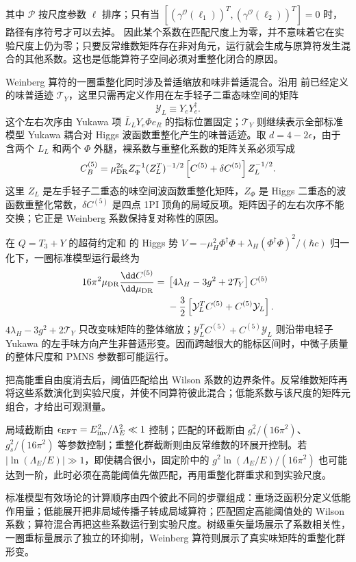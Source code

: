 其中 $\mathcal P$ 按尺度参数 $\ell$ 排序；只有当 $[(\gamma^{\mathcal O}(\ell_1))^T,(\gamma^{\mathcal O}(\ell_2))^T]=0$ 时，路径有序符号才可以去掉。
因此某个系数在匹配尺度上为零，并不意味着它在实验尺度上仍为零；只要反常维数矩阵存在非对角元，运行就会生成与原算符发生混合的其他系数。这也是低能算符子空间必须对重整化闭合的原因。

Weinberg 算符的一圈重整化同时涉及普适缩放和味非普适混合。沿用 前已经定义的味普适迹 $\mathcal T_Y$，这里只需再定义作用在左手轻子二重态味空间的矩阵
\begin{equation*}
 \mathcal Y_L\equiv Y_eY_e^\dagger.
\end{equation*}
这个左右次序由 Yukawa 项 $\bar L_LY_e\Phi e_R$ 的指标位置固定；$\mathcal T_Y$ 则继续表示全部标准模型 Yukawa 耦合对 Higgs 波函数重整化产生的味普适迹。取 $d=4-2\epsilon$，由于 含两个 $L_L$ 和两个 $\Phi$ 外腿，裸系数与重整化系数的矩阵关系必须写成
\begin{equation}
{
 C_B^{(5)}
 =\mu_{\rm DR}^{2\epsilon} Z_\Phi^{-1}
 (Z_L^T)^{-1/2}
 \left[C^{(5)}+\delta C^{(5)}\right]
 Z_L^{-1/2}.}
\label{eq:weinberg-bare-renorm-dp91}
\end{equation}
这里 $Z_L$ 是左手轻子二重态的味空间波函数重整化矩阵，$Z_\Phi$ 是 Higgs 二重态的波函数重整化常数，$\delta C^{(5)}$ 是四点 1PI 顶角的局域反项。矩阵因子的左右次序不能交换；它正是 Weinberg 系数保持复对称性的原因。

在 $Q=T_3+Y$ 的超荷约定和 的 Higgs 势
$V=-\mu_H^2\Phi^\dagger\Phi+\lambda_H(\Phi^\dagger\Phi)^2/(\hbar c)$ 归一化下，一圈标准模型运行最终为
\begin{align}
16\pi^2\mu_{\rm DR}\frac{\dd C^{(5)}}{\dd\mu_{\rm DR}}
={}&\left[4\lambda_H-3g^2+2\mathcal T_Y\right]C^{(5)}\nonumber\\
&-\frac32\left[\mathcal Y_L^T C^{(5)}+C^{(5)}\mathcal Y_L\right].
\label{eq:weinberg-matrix-rg-dp32}
\end{align}
$4\lambda_H-3g^2+2\mathcal T_Y$ 只改变味矩阵的整体缩放；$\mathcal Y_L^TC^{(5)}+C^{(5)}\mathcal Y_L$ 则沿带电轻子 Yukawa 的左手味方向产生非普适形变。因而跨越很大的能标区间时，中微子质量的整体尺度和 PMNS 参数都可能运行。

\label{fig:smeft-matching-running-chain-dp13}
把高能重自由度消去后，阈值匹配给出 Wilson 系数的边界条件。反常维数矩阵再将这些系数演化到实验尺度，并使不同算符彼此混合；低能系数与该尺度的矩阵元组合，才给出可观测量。

局域截断由 $\epsilon_{\rm EFT}=E_{\rm inv}^2/\Lambda_E^2\ll1$ 控制；匹配的环截断由 $g_*^2/(16\pi^2)$、$g_s^2/(16\pi^2)$ 等参数控制；重整化群截断则由反常维数的环展开控制。若 $|\ln(\Lambda_E/E)|\gg1$，即使耦合很小，固定阶中的 $g^2\ln(\Lambda_E/E)/(16\pi^2)$ 也可能达到一阶，此时必须在高能阈值先做匹配，再用重整化群重求和到实验尺度。


标准模型有效场论的计算顺序由四个彼此不同的步骤组成：重场泛函积分定义低能作用量；低能展开把非局域传播子转成局域算符；匹配固定高能阈值处的 Wilson 系数；算符混合再把这些系数运行到实验尺度。树级重矢量场展示了系数相关性，一圈重标量展示了独立的环抑制，Weinberg 算符则展示了真实味矩阵的重整化群形变。

